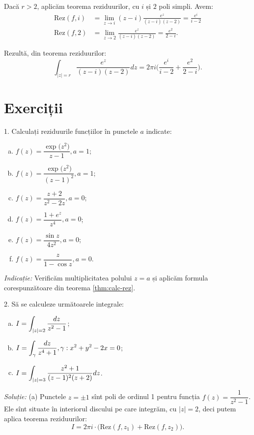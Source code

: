 Dacă $ r > 2 $, aplicăm teorema reziduurilor, cu $ i $ și $ 2 $ poli simpli. Avem:
\begin{align*}
  \mathrm{Rez}(f, i) &= \lim_{z \to i} (z - i) \frac{e^z}{(z - i)(z - 2)} = \frac{e^i}{i - 2} \\
  \mathrm{Rez}(f, 2) &= \lim_{z \to 2} \frac{e^z}{(z - i)(z - 2)} = \frac{e^2}{2 - i}.
\end{align*}

Rezultă, din teorema reziduurilor:
\[
  \int_{|z| = r} \frac{e^z}{(z - i)(z - 2)} dz = 2 \pi i \Big( \frac{e^i}{i - 2} + %
  \frac{e^2}{2 - i} \Big).
\]


\section{Exerciții}

1. Calculați reziduurile funcțiilor în punctele $ a $ indicate:
\begin{enumerate}[(a)]
\item $ f(z) = \dfrac{\exp\big(z^2\big)}{z - 1}, a = 1 $;
\item $ f(z) = \dfrac{\exp\big(z^2\big)}{(z - 1)^2}, a = 1 $;
\item $ f(z) = \dfrac{z + 2}{z^2 - 2z}, a = 0 $;
\item $ f(z) = \dfrac{1 + e^z}{z^4}, a = 0 $;
\item $ f(z) = \dfrac{\sin z}{4z^2}, a = 0 $;
\item $ f(z) = \dfrac{z}{1 - \cos z}, a = 0 $.
\end{enumerate}

\emph{Indicație:} Verificăm multiplicitatea polului $ z = a $ și aplicăm formula
corespunzătoare din teorema \ref{thm:calc-rez}.

\vspace{1cm}

2. Să se calculeze următoarele integrale:
\begin{enumerate}[(a)]
\item $ I = \displaystyle\int_{|z| = 2} \frac{dz}{z^2 - 1} $;
\item $ I = \displaystyle\int_\gamma \frac{dz}{z^4 + 1}, \gamma: x^2 + y^2 - 2x = 0 $;
\item $ I = \displaystyle\int_{|z| = 3} \frac{z^2 + 1}{(z - 1)^2 (z + 2)} dz $.
\end{enumerate}

\emph{Soluție:} (a) Punctele $ z = \pm 1 $ sînt poli de ordinul 1 pentru
funcția $ f(z) = \dfrac{1}{z^2 - 1} $. Ele sînt situate în interiorul discului pe
care integrăm, cu $ |z| = 2 $, deci putem aplica teorema reziduurilor:
\[
  I = 2 \pi i \cdot \Big( \mathrm{Rez}(f, z_1) + \mathrm{Rez}(f, z_2) \Big).
\]

